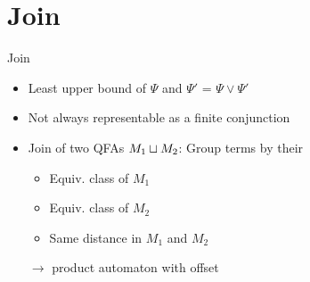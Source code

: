 \documentclass[aspectratio=169]{beamer}
\begin{document}
\section{Join}
\begin{frame}{Join}
\begin{itemize}
    \item Least upper bound of $\Psi$ and $\Psi'$ = $\Psi \lor \Psi'$
    \pause
    \item Not always representable as a finite conjunction~\cite{join}
    \pause
    \item Join of two QFAs $M_1 \sqcup M_2$: Group terms by their
    \begin{itemize}
    \item Equiv. class of $M_1$
    \item Equiv. class of $M_2$
    \item Same distance in $M_1$ and $M_2$
    \end{itemize}
    \pause
    \item[$\rightarrow$] product automaton with offset
\end{itemize}
\end{frame}
\end{document}
